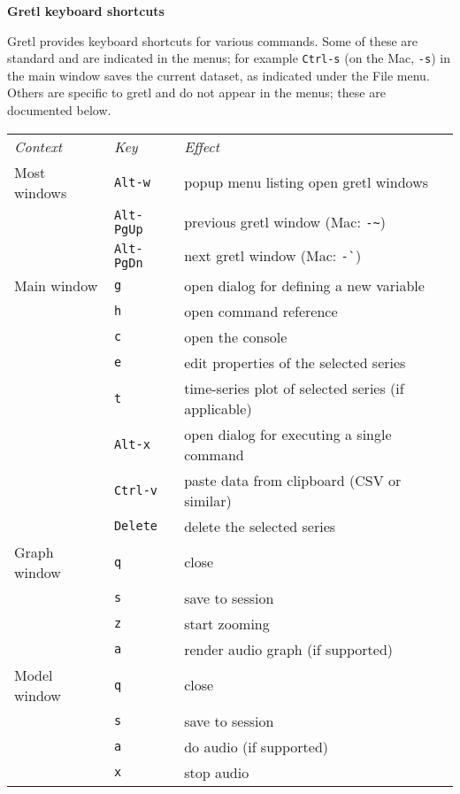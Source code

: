 \documentclass{article}
\newcommand{\quatre}{\Pisymbol{pwd}{122}}
\begin{document}
\setlength{\parindent}{0pt}
\setlength{\parskip}{1ex}
\thispagestyle{empty}

\begin{center}
{\large \textbf{Gretl keyboard shortcuts}}
\end{center}

Gretl provides keyboard shortcuts for various commands. Some of these
are standard and are indicated in the menus; for example
\texttt{Ctrl-s} (on the Mac, \quatre\texttt{-s}) in the
main window saves the current dataset, as indicated under the
\textsf{File} menu. Others are specific to gretl and do not appear in
the menus; these are documented below.

\begin{center}
\begin{tabular}{p{}lp{}}
\textit{Context} & \textit{Key} & \textit{Effect} \\[6pt]

Most windows & \texttt{Alt-w} & 
  popup menu listing open \textsf{gretl} windows \\
 & \texttt{Alt-PgUp} & previous gretl window (Mac: \quatre\texttt{-\textasciitilde})  \\
 & \texttt{Alt-PgDn} & next gretl window (Mac: \quatre\texttt{-\`{}}) \\[6pt]

Main window & \texttt{g} & 
  open dialog for defining a new variable \\
 & \texttt{h} & open command reference \\
 & \texttt{c} & open the console \\
 & \texttt{e} & edit properties of the selected series \\
 & \texttt{t} & time-series plot of selected series (if applicable) \\
 & \texttt{Alt-x} & open dialog for executing a single command \\
 & \texttt{Ctrl-v} & paste data from clipboard (CSV or similar) \\
 & \texttt{Delete} & delete the selected series \\[6pt]

Graph window & \texttt{q} & close \\
 & \texttt{s} & save to session \\
 & \texttt{z} & start zooming \\
 & \texttt{a} & render audio graph (if supported) \\[6pt]

Model window & \texttt{q} & close \\
 & \texttt{s} & save to session \\
 & \texttt{a} & do audio (if supported) \\
 & \texttt{x} & stop audio \\[6pt]


\end{tabular}
\end{center}
\end{document}
